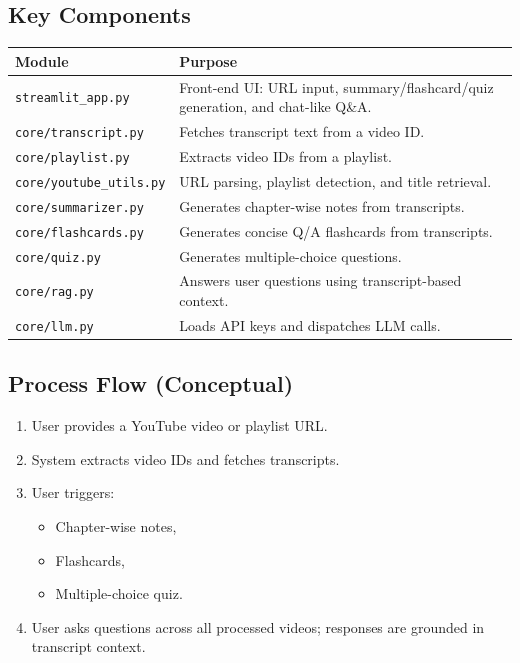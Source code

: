 \documentclass[11pt]{article}
\begin{document}
\subsection{Key Components}
\begin{longtable}{p{}p{}}
\toprule
\textbf{Module} & \textbf{Purpose} \\
\midrule
\texttt{streamlit\_app.py} & Front-end UI: URL input, summary/flashcard/quiz generation, and chat-like Q\&A. \\
\texttt{core/transcript.py} & Fetches transcript text from a video ID. \\
\texttt{core/playlist.py} & Extracts video IDs from a playlist. \\
\texttt{core/youtube\_utils.py} & URL parsing, playlist detection, and title retrieval. \\
\texttt{core/summarizer.py} & Generates chapter-wise notes from transcripts. \\
\texttt{core/flashcards.py} & Generates concise Q/A flashcards from transcripts. \\
\texttt{core/quiz.py} & Generates multiple-choice questions. \\
\texttt{core/rag.py} & Answers user questions using transcript-based context. \\
\texttt{core/llm.py} & Loads API keys and dispatches LLM calls. \\
\bottomrule
\end{longtable}

\subsection{Process Flow (Conceptual)}
\begin{enumerate}[leftmargin=2em]
    \item User provides a YouTube video or playlist URL.
    \item System extracts video IDs and fetches transcripts.
    \item User triggers:
    \begin{itemize}
        \item Chapter-wise notes,
        \item Flashcards,
        \item Multiple-choice quiz.
    \end{itemize}
    \item User asks questions across all processed videos; responses are grounded in transcript context.
\end{enumerate}
\end{document}
